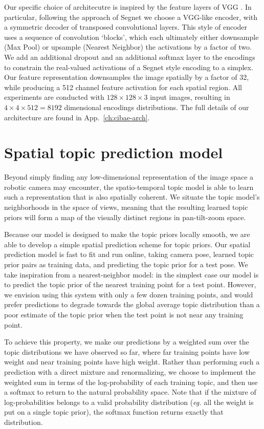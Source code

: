 Our specific choice of architecutre is inspired by the feature layers of VGG \citep{Simonyan14c}. In particular, following the approach of Segnet \citep{BadrinarayananK15} we choose a VGG-like encoder, with a symmetric decoder of transposed convolutional layers. This style of encoder uses a sequence of convolution `blocks', which each ultimately either downsample (Max Pool) or upsample (Nearest Neighbor) the activations by a factor of two. We add an additional dropout and an additional softmax layer to the encodings to constrain the real-valued activations of a Segnet style encoding to a simplex. Our feature representation downsamples the image spatially by a factor of 32, while producing a 512 channel feature activation for each spatial region. All experiments are conducted with $128 \times 128 \times 3$ input images, resulting in $4 \times 4 \times 512 = 8192$ dimensional encodings distributions. The full details of our architecture are found in App.~\ref{ch:cibae-arch}.

\section{Spatial topic prediction model}

Beyond simply finding any low-dimensional representation of the image space a robotic camera may encounter, the spatio-temporal topic model is able to learn such a representation that is also spatially coherent. We situate the topic model's neighborhoods in the space of views, meaning that the resulting learned topic priors will form a map of the visually distinct regions in pan-tilt-zoom space.

Because our model is designed to make the topic priors locally smooth, we are able to develop a simple spatial prediction scheme for topic priors. Our spatial prediction model is fast to fit and run online, taking camera pose, learned topic prior pairs as training data, and predicting the topic prior for a test pose. We take inspiration from a nearest-neighbor model: in the simplest case our model is to predict the topic prior of the nearest training point for a test point. However, we envision using this system with only a few dozen training points, and would prefer predictions to degrade towards the global average topic distribution than a poor estimate of the topic prior when the test point is not near any training point.

To achieve this property, we make our predictions by a weighted sum over the topic distributions we have observed so far, where far training points have low weight and near training points have high weight. Rather than performing such a prediction with a direct mixture and renormalizing, we choose to implement the weighted sum in terms of the log-probability of each training topic, and then use a softmax to return to the natural probability space. Note that if the mixture of log-probabilities belongs to a valid probability distribution (\emph{eg.} all the weight is put on a single topic prior), the softmax function returns exactly that distribution.



